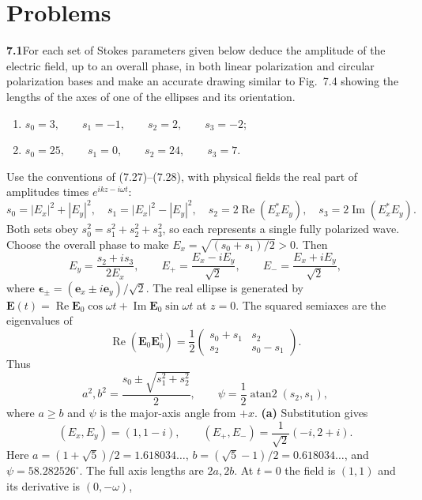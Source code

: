 
\section*{Problems}

\par\bigskip
\noindent\textbf{7.1}\quad For each set of Stokes parameters given below deduce the amplitude of the electric field, up to an overall phase, in both linear polarization and circular polarization bases and make an accurate drawing similar to Fig.~7.4 showing the lengths of the axes of one of the ellipses and its orientation.
\begin{enumerate}
\item[(a)] $s_{0}=3,\qquad s_{1}=-1,\qquad s_{2}=2,\qquad s_{3}=-2$;
\item[(b)] $s_{0}=25,\qquad s_{1}=0,\qquad s_{2}=24,\qquad s_{3}=7$.
\end{enumerate}
\solution
Use the conventions of (7.27)--(7.28), with physical fields the real
part of amplitudes times $e^{ikz-i\omega t}$:
\[
s_0=|E_x|^2+|E_y|^2,\quad s_1=|E_x|^2-|E_y|^2,\quad
s_2=2\operatorname{Re}(E_x^*E_y),\quad
s_3=2\operatorname{Im}(E_x^*E_y).
\]
Both sets obey $s_0^2=s_1^2+s_2^2+s_3^2$, so each represents a
single fully polarized wave. Choose the overall phase to make
$E_x=\sqrt{(s_0+s_1)/2}>0$. Then
\[
E_y=\frac{s_2+is_3}{2E_x},\qquad
E_+=\frac{E_x-iE_y}{\sqrt2},\qquad
E_-=\frac{E_x+iE_y}{\sqrt2},
\]
where $\boldsymbol\epsilon_\pm=(\mathbf e_x\pm i\mathbf e_y)/\sqrt2$.
The real ellipse is generated by
$\mathbf E(t)=\operatorname{Re}\mathbf E_0\cos\omega t
+\operatorname{Im}\mathbf E_0\sin\omega t$ at $z=0$.
The squared semiaxes are the eigenvalues of
\[
\operatorname{Re}(\mathbf E_0\mathbf E_0^\dagger)
=\frac12\begin{pmatrix}s_0+s_1&s_2\\s_2&s_0-s_1\end{pmatrix}.
\]
Thus
\[
a^2,b^2=\frac{s_0\pm\sqrt{s_1^2+s_2^2}}2,\qquad
\psi=\frac12\operatorname{atan2}(s_2,s_1),
\]
where $a\geq b$ and $\psi$ is the major-axis angle from $+x$.
\textbf{(a)} Substitution gives
\[
\boxed{(E_x,E_y)=(1,1-i),\qquad
(E_+,E_-)=\frac1{\sqrt2}(-i,2+i).}
\]
Here $a=(1+\sqrt5)/2=1.618034\ldots$,
$b=(\sqrt5-1)/2=0.618034\ldots$, and
$\psi=58.282526^\circ$. The full axis lengths are $2a,2b$.
At $t=0$ the field is $(1,1)$ and its derivative is $(0,-\omega)$,
